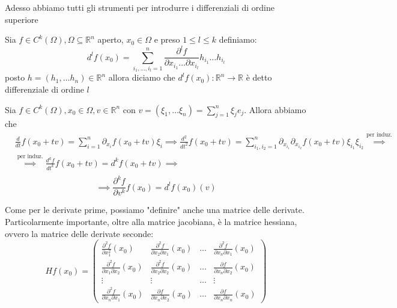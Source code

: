 Adesso abbiamo tutti gli strumenti per introdurre i differenziali di ordine superiore
\begin{definition}
	Sia $f \in C^k(\Omega), \Omega \subseteq \mathbb{R}^n$ aperto, $x_0 \in \Omega$ e preso $1 \leq l \leq k$ definiamo:
	$$
	d^l f(x_0) = \sum_{i_1, \ldots, i_l = 1}^n \frac{\partial^l f}{\partial x_{i_1} \ldots \partial x_{i_l}} h_{i_1} \ldots h_{i_l}
	$$
	posto $h=(h_1, \ldots h_n) \in \mathbb{R}^n$ allora diciamo che $d^l f(x_0):\mathbb{R}^n \to \mathbb{R}$ è detto differenziale di ordine $l$
\end{definition}
\begin{remark}
Sia $f \in C^k (\Omega), x_0 \in \Omega, v \in \mathbb{R}^n$ con $v = (\xi_1, \ldots \xi_n) = \sum_{j=1}^n \xi_j e_j$. Allora abbiamo che
\begin{align*}
&\frac{d}{dt} f(x_0 + tv) = \sum_{i=1}^n \partial_{x_i} f (x_0 + tv) \xi_i \implies \frac{d^2}{dt^2} f(x_0 + tv) = \sum_{i_1, i_2 = 1}^{n} \partial_{x_{i_1}} \partial_{x_{i_2}} f(x_0 + tv) \xi_{i_1} \xi_{i_2}\stackrel{\text{per induz.}}{\implies} \\ &\stackrel{\text{per induz.}}{\implies} \frac{d^k f}{dt^k} f(x_0 + tv) = d^k f(x_0 + tv) \implies \\
\end{align*}
\begin{equation}
\implies \boxed{\frac{\partial^k f}{\partial v^k} f(x_0) = d^l f(x_0)(v)}
\end{equation}
\end{remark}
Come per le derivate prime, possiamo "definire" anche una matrice delle derivate. Particolarmente importante, oltre alla matrice jacobiana, è la matrice hessiana, ovvero la matrice delle derivate seconde:
\begin{equation}
Hf(x_0) = \begin{pmatrix}
\frac{\partial^2 f}{\partial x_1^2}(x_0) & \frac{\partial^2 f}{\partial x_2 \partial x_1}(x_0) & \ldots & \frac{\partial^2 f}{\partial x_n \partial x_1}(x_0) \\
\frac{\partial^2 f}{\partial x_1 \partial x_2}(x_0) & \frac{\partial^2 f}{\partial x_2 \partial x_2}(x_0) & \ldots & \frac{\partial f}{\partial x_n \partial x_2}(x_0) \\
\vdots & \vdots & \ldots & \vdots \\
\frac{\partial^2 f}{\partial x_n \partial x_1}(x_0) & \frac{\partial f}{\partial x_n \partial x_2}(x_0) & \ldots & \frac{\partial f}{\partial x_n \partial x_n}(x_0)
\end{pmatrix}
\end{equation}
